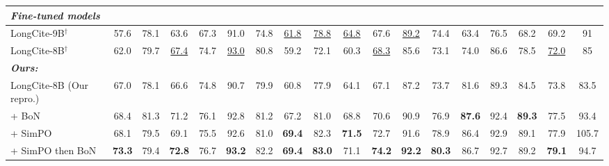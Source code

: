 \begin{table*}[t]
{\begin{tabular}{l|ccc|ccc|ccc|ccc|ccc|c|c}
			\multicolumn{18}{l}{\textit{\bf Fine-tuned models}}                                                                                                                                                                                                                                                                                     \\\midrule
			LongCite-9B$^\dagger$            & 57.6                                    & 78.1                                  & 63.6                              & 67.3        & 91.0      & 74.8 & \underline{61.8}  & \underline{78.8} & \underline{64.8} & 67.6           & \underline{89.2} & 74.4 & 63.4 & 76.5 & 68.2 & 69.2   & 91         \\
			LongCite-8B$^\dagger$            & 62.0                                    & 79.7                                  & \underline{67.4}                  & 74.7                              & \underline{93.0}       & 80.8     & 59.2 & 72.1 & 60.3 & \underline{68.3} & 85.6 & 73.1 & 74.0 & 86.6 & 78.5 &\underline{72.0}& 85         \\ \midrule
			\multicolumn{18}{l}{\textit{\bf Ours: \ours}}                                                                                                                                                                                                                                                                                           \\\midrule

			LongCite-8B (Our repro.)         & 67.0                                    & 78.1                                  & 66.6                              & 74.8                              & 90.7                               & 79.9     & 60.8         & 77.9 & 64.1 & 67.1 & 87.2 & 73.7 & 81.6 & 89.3 & 84.5 & 73.8   & 83.5       \\
			+ BoN                            & 68.4                                    & 81.3                                  & 71.2                              & 76.1                              & 92.8                               & 81.2     & 67.2 & 81.0   & 68.8 & 70.6 & 90.9 & 76.9 & \bf 87.6 & 92.4 & \bf 89.3 & 77.5   & 93.4       \\
			+ SimPO                          & 68.1                                    & 79.5                                  & 69.1                              & 75.5                              & 92.6                               & 81.0     & \bf 69.4 & 82.3 & \bf 71.5 & 72.7 & 91.6 & 78.9 & 86.4 & 92.9 & 89.1 & 77.9   & 105.7      \\
			+ SimPO then BoN                 & \bf 73.3                                & 79.4                                  & \bf 72.8                          & 76.7                              & \bf 93.2    & 82.2 & \bf 69.4 & \bf 83.0 & 71.1 & \bf 74.2 & \bf 92.2 &                \bf 80.3 & 86.7 & 92.7 & 89.2 & \bf 79.1   & 94.7       \\


\end{tabular}}
\end{table*}
